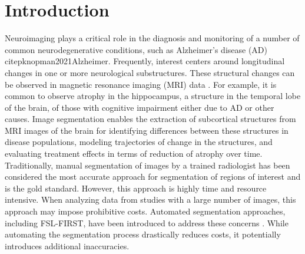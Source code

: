 \documentclass[12pt]{article}
\theoremstyle{definition}
\begin{document}
\section{Introduction}
Neuroimaging plays a critical role in the diagnosis and monitoring of a number of common neurodegenerative conditions, such as Alzheimer's disease (AD) citep{knopman2021Alzheimer}. Frequently, interest centers around longitudinal changes in one or more neurological substructures. These structural changes can be observed in magnetic resonance imaging (MRI) data \citep{crainiceanu2016tutorial}. For example, it is common to observe atrophy in the hippocampus, a structure in the temporal lobe of the brain, of those with  cognitive impairment either due to AD or other causes. Image segmentation enables the extraction of subcortical structures from MRI images of the brain for identifying differences between these structures in disease populations, modeling trajectories of change in the structures, and evaluating treatment effects in terms of reduction of atrophy over time. Traditionally, manual segmentation of images by a trained radiologist has been considered the most accurate approach for segmentation of regions of interest and is the gold standard. However, this approach is highly time and resource intensive. When analyzing data from studies with a large number of images, this approach may impose prohibitive costs. Automated segmentation approaches, including FSL-FIRST, have been introduced to address these concerns \citep{patenaude2011Bayesian}. While automating the segmentation process drastically reduces costs, it potentially introduces additional inaccuracies.
\end{document}
